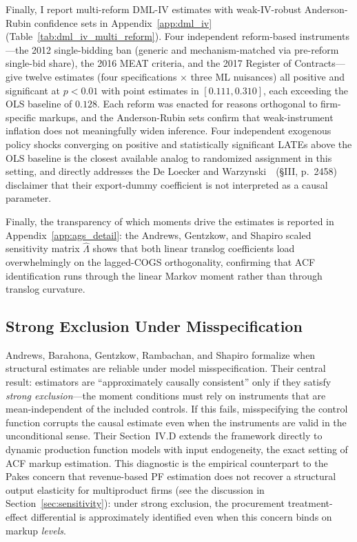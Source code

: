 \documentclass[11pt]{article}
\begin{document}


Finally, I report multi-reform DML-IV estimates with weak-IV-robust Anderson-Rubin \cite{AndersonRubin1949} confidence sets in Appendix~\ref{app:dml_iv} (Table~\ref{tab:dml_iv_multi_reform}). Four independent reform-based instruments---the 2012 single-bidding ban (generic and mechanism-matched via pre-reform single-bid share), the 2016 MEAT criteria, and the 2017 Register of Contracts---give twelve estimates (four specifications $\times$ three ML nuisances) all positive and significant at $p < 0.01$ with point estimates in $[0.111, 0.310]$, each exceeding the OLS baseline of $0.128$. Each reform was enacted for reasons orthogonal to firm-specific markups, and the Anderson-Rubin sets confirm that weak-instrument inflation does not meaningfully widen inference. Four independent exogenous policy shocks converging on positive and statistically significant LATEs above the OLS baseline is the closest available analog to randomized assignment in this setting, and directly addresses the De Loecker and Warzynski~\cite{DLW2012}~(\S III, p.~2458) disclaimer that their export-dummy coefficient is not interpreted as a causal parameter.

Finally, the transparency of which moments drive the estimates is reported in Appendix~\ref{app:ags_detail}: the Andrews, Gentzkow, and Shapiro \cite{AGS2017} scaled sensitivity matrix $\hat\Lambda$ shows that both linear translog coefficients load overwhelmingly on the lagged-COGS orthogonality, confirming that ACF identification runs through the linear Markov moment rather than through translog curvature.

\subsection{Strong Exclusion Under Misspecification}\label{sec:abgrs}

Andrews, Barahona, Gentzkow, Rambachan, and Shapiro \cite{ABGRS2025} formalize when structural estimates are reliable under model misspecification. Their central result: estimators are ``approximately causally consistent'' only if they satisfy \emph{strong exclusion}---the moment conditions must rely on instruments that are mean-independent of the included controls. If this fails, misspecifying the control function corrupts the causal estimate even when the instruments are valid in the unconditional sense. Their Section~IV.D extends the framework directly to dynamic production function models with input endogeneity, the exact setting of ACF markup estimation. This diagnostic is the empirical counterpart to the Pakes \cite{Pakes2021AnnRev} concern that revenue-based PF estimation does not recover a structural output elasticity for multiproduct firms (see the discussion in Section~\ref{sec:sensitivity}): under strong exclusion, the procurement treatment-effect differential is approximately identified even when this concern binds on markup \emph{levels}.
\end{document}
